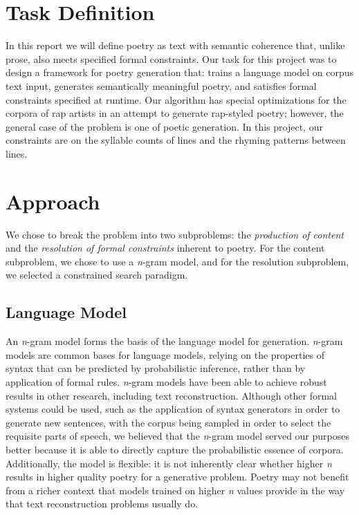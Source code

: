 \documentclass[10pt,twocolumn]{article}
\begin{document}
\section{Task Definition}
In this report we will define poetry as text with semantic coherence that, unlike prose, also meets specified formal constraints. Our task for this project was to design a framework for poetry generation that: trains a language model on corpus text input, generates semantically meaningful poetry, and satisfies formal constraints specified at runtime. Our algorithm has special optimizations for the corpora of rap artists in an attempt to generate rap-styled poetry; however, the general case of the problem is one of poetic generation. In this project, our constraints are on the syllable counts of lines and the rhyming patterns between lines. 

\section{Approach}
We chose to break the problem into two subproblems: the \emph{production of content} and the \emph{resolution of formal constraints} inherent to poetry. For the content subproblem, we chose to use a \emph{n}-gram model, and for the resolution subproblem, we selected a constrained search paradigm. 

\subsection{Language Model}
An \emph{n}-gram model forms the basis of the language model for generation. \emph{n}-gram models are common bases for language models, relying on the properties of syntax that can be predicted by probabilistic inference, rather than by application of formal rules.\cite{Dunning} \emph{n}-gram models have been able to achieve robust results in other research, including text reconstruction. Although other formal systems could be used, such as the application of syntax generators in order to generate new sentences, with the corpus being sampled in order to select the requisite parts of speech, we believed that the \emph{n}-gram model served our purposes better because it is able to directly capture the probabilistic essence of corpora. Additionally, the model is flexible: it is not inherently clear whether higher \emph{n} results in higher quality poetry for a generative problem. Poetry may not benefit from a richer context that models trained on higher \emph{n} values provide in the way that text reconstruction problems usually do.
\end{document}
